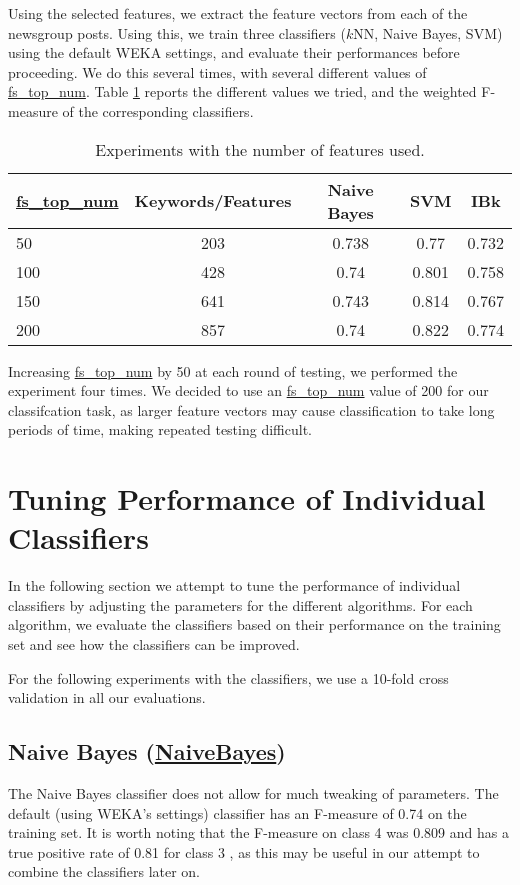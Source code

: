 \documentclass[12pt]{article}
\begin{document}
Using the selected features, we extract the feature vectors from each of the newsgroup posts. Using this, we train three classifiers ($k$NN, Naive Bayes, SVM) using the default WEKA settings, and evaluate their performances before proceeding. We do this several times, with several different values of \url{fs_top_num}. Table \ref{table:fs} reports the different values we tried, and the weighted F-measure of the corresponding classifiers.
\begin{table}[h]
\linespread{1}
\label{table:fs}
\centering
\begin{tabular}{|l|c| c c c |}
\hline 
	\url{fs_top_num} & Keywords/Features   & \textbf{Naive Bayes}& \textbf{SVM} & \textbf{IBk} \\
\hline
	50	& 203	& 0.738 & 0.77 	& 0.732 \\
	100	& 428   & 0.74	& 0.801	& 0.758	\\
	150 & 641	& 0.743 & 0.814 & 0.767 \\
	200 & 857	& 0.74	& 0.822 & 0.774 \\
\hline
\end{tabular}
\caption{Experiments with the number of features used.}
\end{table}

Increasing \url{fs_top_num} by 50 at each round of testing, we performed the experiment four times. We decided to use an \url{fs_top_num} value of 200 for our classifcation task, as larger feature vectors may cause classification to take long periods of time, making repeated testing difficult. 	
	
	



\section{Tuning Performance of Individual Classifiers}
In the following section we attempt to tune the performance of individual classifiers by adjusting the parameters for the different algorithms. For each algorithm, we evaluate the classifiers based on their performance on the training set and see how the classifiers can be improved.

For the following experiments with the classifiers, we use a 10-fold cross validation in all our evaluations.
\subsection{Naive Bayes (\url{NaiveBayes})}
The Naive Bayes classifier does not allow for much tweaking of parameters. The default (using WEKA's settings) classifier has an  F-measure of 0.74 on the training set. It is worth noting that the F-measure on class 4 was 0.809 and has a true positive rate of 0.81 for class 3 , as this may be useful in our attempt to combine the classifiers later on.
\end{document}
